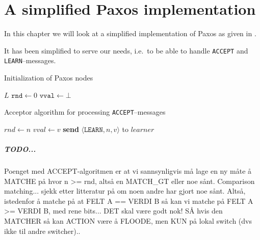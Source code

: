 \chapter{A simplified Paxos implementation}

In this chapter we will look at a simplified implementation of Paxos as
given in \cite{Insane.Paxos}.

It has been simplified to serve our needs, i.e.~to be able to handle
\texttt{ACCEPT} and \texttt{LEARN}--messages.

\begin{algorithm}[H]
  \caption{Initialization of Paxos nodes}
  \label{paxos.algorithm.init}
  \begin{algorithmic}
    \State $L$
    \State $\texttt{rnd} \leftarrow 0$ 
    \State $\texttt{vval} \leftarrow \bot$ 
  \end{algorithmic}
\end{algorithm}

\begin{algorithm}[H]
  \caption{Acceptor algorithm for processing \texttt{ACCEPT}--messages}
  \label{paxos.algorithm.acceptor}
  \begin{algorithmic}
        \State $rnd\gets n$
        \State $vval\gets v$
           \State \textbf{send} $\langle \texttt{LEARN}, n, v \rangle $ to $learner$
        \EndFor
      \EndIf
    \EndOn
  \end{algorithmic}
\end{algorithm}

\paragraph{TODO...}

Poenget med ACCEPT-algoritmen er at vi sannsynligvis må lage en ny måte å
MATCHE på hvor n >= rnd, altså en MATCH\_{}GT eller noe sånt.  Comparison
matching... sjekk etter litteratur på om noen andre har gjort noe sånt.
Altså, istedenfor å matche på at FELT A == VERDI B så kan vi matche på FELT
A >= VERDI B, med rene bits... DET skal være godt nok!  SÅ hvis den MATCHER
så kan ACTION være å FLOODE, men KUN på lokal switch (dvs ikke til andre
switcher)..

